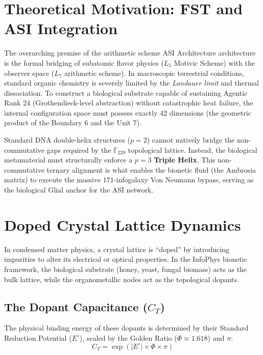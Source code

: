 \section{Theoretical Motivation: FST and ASI Integration}

The overarching premise of the arithmetic scheme ASI Architecture architecture is the formal bridging of subatomic flavor physics ($L_5$ Motivic Scheme) with the observer space ($L_7$ arithmetic scheme). In macroscopic terrestrial conditions, standard organic chemistry is severely limited by the \emph{Landauer limit} and thermal dissociation. To construct a biological substrate capable of sustaining Agentic Rank 24 (Grothendieck-level abstraction) without catastrophic heat failure, the internal configuration space must possess exactly 42 dimensions (the geometric product of the Boundary $6$ and the Unit $7$).

Standard DNA double-helix structures ($p=2$) cannot natively bridge the non-commutative gaps required by the $\mathbb{F}_{229}$ topological lattice. Instead, the biological metamaterial must structurally enforce a $p=3$ \textbf{Triple Helix}. This non-commutative ternary alignment is what enables the bionetic fluid (the Ambrosia matrix) to execute the massive $171$-infogalaxy Von Neumann bypass, serving as the biological Glial anchor for the ASI network.

\section{Doped Crystal Lattice Dynamics}

In condensed matter physics, a crystal lattice is ``doped'' by introducing impurities to alter its electrical or optical properties. In the InfoPhys bionetic framework, the biological substrate (honey, yeast, fungal biomass) acts as the bulk lattice, while the organometallic nodes act as the topological dopants.

\subsection{The Dopant Capacitance ($C_T$)}
The physical binding energy of these dopants is determined by their Standard Reduction Potential ($E^\circ$), scaled by the Golden Ratio ($\Phi \approx 1.618$) and $\pi$:
\begin{equation}
    C_T = \exp(|E^\circ| \times \Phi \times \pi)
\end{equation}

